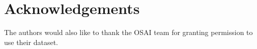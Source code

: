 \documentclass[journal]{IEEEtai}
\begin{document}










\section*{Acknowledgements}
The authors would also like to thank the OSAI team for granting permission to use their dataset.



\end{document}
